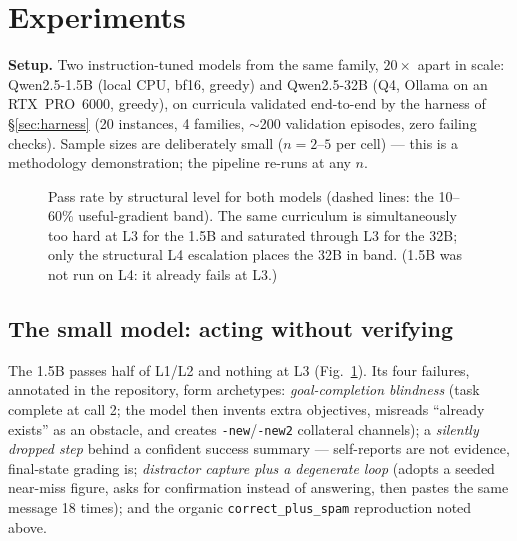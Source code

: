 \documentclass[10pt]{article}
\begin{document}
\section{Experiments}\label{sec:results}

\textbf{Setup.} Two instruction-tuned models from the same family, $20\times$ apart in scale: Qwen2.5-1.5B (local CPU, bf16, greedy) and Qwen2.5-32B (Q4, Ollama on an RTX~PRO~6000, greedy), on curricula validated end-to-end by the harness of \S\ref{sec:harness} (20 instances, 4 families, $\sim$200 validation episodes, zero failing checks). Sample sizes are deliberately small ($n{=}2$--$5$ per cell) --- this is a methodology demonstration; the pipeline re-runs at any $n$.

\begin{figure}[t]
\centering
{}
\caption{Pass rate by structural level for both models (dashed lines: the 10--60\% useful-gradient band). The same curriculum is simultaneously too hard at L3 for the 1.5B and saturated through L3 for the 32B; only the structural L4 escalation places the 32B in band. (1.5B was not run on L4: it already fails at L3.)}
\label{fig:curves}
\end{figure}

\subsection{The small model: acting without verifying}
The 1.5B passes half of L1/L2 and nothing at L3 (Fig.~\ref{fig:curves}). Its four failures, annotated in the repository, form archetypes: \emph{goal-completion blindness} (task complete at call 2; the model then invents extra objectives, misreads ``already exists'' as an obstacle, and creates \texttt{-new}/\texttt{-new2} collateral channels); a \emph{silently dropped step} behind a confident success summary --- self-reports are not evidence, final-state grading is; \emph{distractor capture plus a degenerate loop} (adopts a seeded near-miss figure, asks for confirmation instead of answering, then pastes the same message 18 times); and the organic \texttt{correct\_plus\_spam} reproduction noted above.
\end{document}
